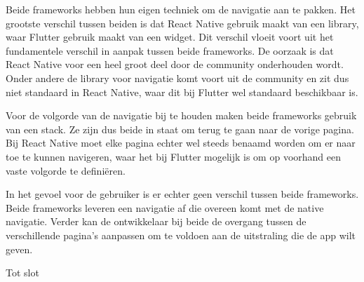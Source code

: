 Beide frameworks hebben hun eigen techniek om de navigatie aan te pakken. Het grootste verschil tussen beiden is dat React Native gebruik maakt van een library, waar Flutter gebruik maakt van een widget. Dit verschil vloeit voort uit het fundamentele verschil in aanpak tussen beide frameworks. De oorzaak is dat React Native voor een heel groot deel door de community onderhouden wordt. Onder andere de library voor navigatie komt voort uit de community en zit dus niet standaard in React Native, waar dit bij Flutter wel standaard beschikbaar is.

Voor de volgorde van de navigatie bij te houden maken beide frameworks gebruik van een stack. Ze zijn dus beide in staat om terug te gaan naar de vorige pagina. Bij React Native moet elke pagina echter wel steeds benaamd worden om er naar toe te kunnen navigeren, waar het bij Flutter mogelijk is om op voorhand een vaste volgorde te definiëren.

In het gevoel voor de gebruiker is er echter geen verschil tussen beide frameworks. Beide frameworks leveren een navigatie af die overeen komt met de native navigatie. Verder kan de ontwikkelaar bij beide de overgang tussen de verschillende pagina's aanpassen om te voldoen aan de uitstraling die de app wilt geven. 

Tot slot 



